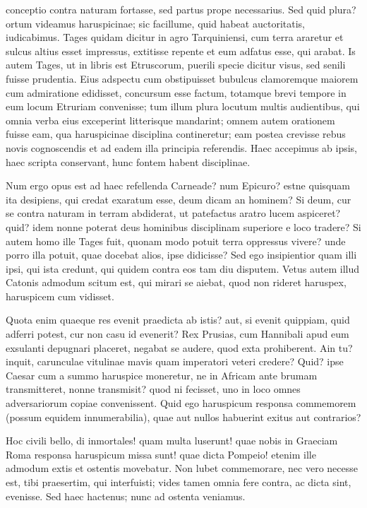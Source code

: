  conceptio contra naturam fortasse, sed partus prope necessarius. Sed quid plura? ortum videamus haruspicinae; sic facillume, quid habeat auctoritatis, iudicabimus. Tages quidam dicitur in agro Tarquiniensi, cum terra araretur et sulcus altius esset impressus, extitisse repente et eum adfatus esse, qui arabat. Is autem Tages, ut in libris est Etruscorum, puerili specie dicitur visus, sed senili fuisse prudentia. Eius adspectu cum obstipuisset bubulcus clamoremque maiorem cum admiratione edidisset, concursum esse factum, totamque brevi tempore in eum locum Etruriam convenisse; tum illum plura locutum multis audientibus, qui omnia verba eius exceperint litterisque mandarint; omnem autem orationem fuisse eam, qua haruspicinae disciplina contineretur; eam postea crevisse rebus novis cognoscendis et ad eadem illa principia referendis. Haec accepimus ab ipsis, haec scripta conservant, hunc fontem habent disciplinae.

 Num ergo opus est ad haec refellenda Carneade? num Epicuro? estne quisquam ita desipiens, qui credat exaratum esse, deum dicam an hominem? Si deum, cur se contra naturam in terram abdiderat, ut patefactus aratro lucem aspiceret? quid? idem nonne poterat deus hominibus disciplinam superiore e loco tradere? Si autem homo ille Tages fuit, quonam modo potuit terra oppressus vivere? unde porro illa potuit, quae docebat alios, ipse didicisse? Sed ego insipientior quam illi ipsi, qui ista credunt, qui quidem contra eos tam diu disputem. Vetus autem illud Catonis admodum scitum est, qui mirari se aiebat, quod non rideret haruspex, haruspicem cum vidisset.

 Quota enim quaeque res evenit praedicta ab istis? aut, si evenit quippiam, quid adferri potest, cur non casu id evenerit? Rex Prusias, cum Hannibali apud eum exsulanti depugnari placeret, negabat se audere, quod exta prohiberent. Ain tu? inquit, carunculae vitulinae mavis quam imperatori veteri credere? Quid? ipse Caesar cum a summo haruspice moneretur, ne in Africam ante brumam transmitteret, nonne transmisit? quod ni fecisset, uno in loco omnes adversariorum copiae convenissent. Quid ego haruspicum responsa commemorem (possum equidem innumerabilia), quae aut nullos habuerint exitus aut contrarios?

 Hoc civili bello, di inmortales! quam multa luserunt! quae nobis in Graeciam Roma responsa haruspicum missa sunt! quae dicta Pompeio! etenim ille admodum extis et ostentis movebatur. Non lubet commemorare, nec vero necesse est, tibi praesertim, qui interfuisti; vides tamen omnia fere contra, ac dicta sint, evenisse. Sed haec hactenus; nunc ad ostenta veniamus.

